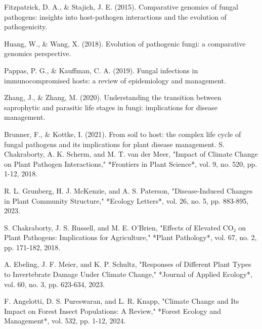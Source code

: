 \documentclass{article}
\begin{document}
\begin{thebibliography}{99}
 Fitzpatrick, D. A., \& Stajich, J. E. (2015). Comparative genomics of fungal pathogens: insights into host-pathogen interactions and the evolution of pathogenicity.

 Huang, W., \& Wang, X. (2018). Evolution of pathogenic fungi: a comparative genomics perspective.

 Pappas, P. G., \& Kauffman, C. A. (2019). Fungal infections in immunocompromised hosts: a review of epidemiology and management.

 Zhang, J., \& Zhang, M. (2020). Understanding the transition between saprophytic and parasitic life stages in fungi: implications for disease management.

 Brunner, F., \& Kottke, I. (2021). From soil to host: the complex life cycle of fungal pathogens and its implications for plant disease management.
 S. Chakraborty, A. K. Scherm, and M. T. van der Meer, "Impact of Climate Change on Plant Pathogen Interactions," *Frontiers in Plant Science*, vol. 9, no. 520, pp. 1-12, 2018.

 R. L. Grunberg, H. J. McKenzie, and A. S. Paterson, "Disease-Induced Changes in Plant Community Structure," *Ecology Letters*, vol. 26, no. 5, pp. 883-895, 2023.

 S. Chakraborty, J. S. Russell, and M. E. O'Brien, "Effects of Elevated CO₂ on Plant Pathogens: Implications for Agriculture," *Plant Pathology*, vol. 67, no. 2, pp. 171-182, 2018.

 A. Ebeling, J. F. Meier, and K. P. Schultz, "Responses of Different Plant Types to Invertebrate Damage Under Climate Change," *Journal of Applied Ecology*, vol. 60, no. 3, pp. 623-634, 2023.

 F. Angelotti, D. S. Pureswaran, and L. R. Knapp, "Climate Change and Its Impact on Forest Insect Populations: A Review," *Forest Ecology and Management*, vol. 532, pp. 1-12, 2024.
	
\end{thebibliography}
\end{document}
